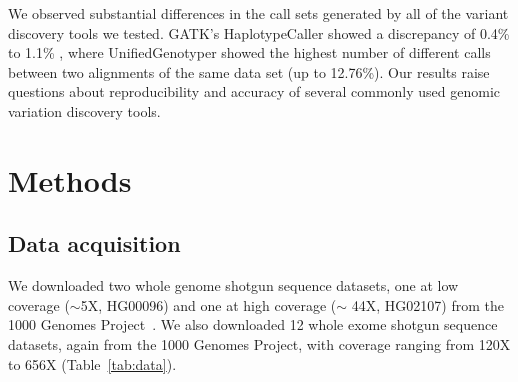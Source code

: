 \documentclass[10pt,a4paper]{article}
\begin{document}
We observed substantial differences in the call sets generated by all of the variant discovery tools we tested. GATK's HaplotypeCaller showed a discrepancy of 0.4\% to 1.1\% , 
where UnifiedGenotyper showed the highest number of different calls between two alignments of the same data set (up to 12.76\%). 
Our results raise questions about reproducibility and accuracy of several commonly used genomic variation discovery tools. 





\section{Methods}

\subsection{Data acquisition}
We downloaded two whole genome shotgun sequence datasets, one at low coverage ($\sim$5X, HG00096) and one at high coverage ($\sim$ 44X, HG02107) from the 1000 Genomes Project~\cite{1000GP2012}.
We also downloaded 12 whole exome shotgun sequence datasets, again from the 1000 Genomes Project, with coverage ranging from 120X to 656X (Table~\ref{tab:data}). 
\end{document}
